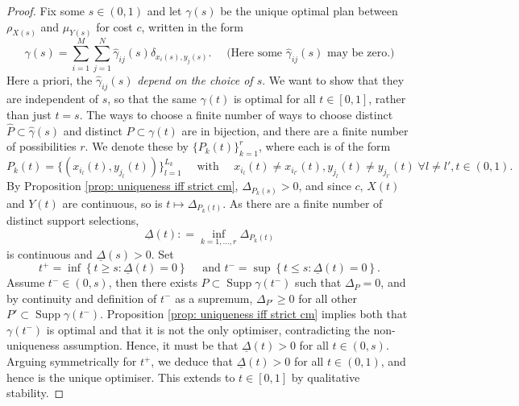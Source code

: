 \documentclass[11pt, oneside, titlepage]{book}
\theoremstyle{plain}
\theoremstyle{definition}
\DeclareMathOperator{\supp}{Supp}
\begin{document}
\begin{proof}
Fix some $s \in (0, 1)$ and let $\gamma(s)$ be the unique optimal plan between $\rho_{X(s)}$ and $\mu_{Y(s)}$ for cost $c$, written in the form
\begin{equation}
\label{eq: gamma(s) definion}
    \gamma(s) = \sum_{i = 1}^{M}\sum_{j=1}^N \hat\gamma_{ij}(s) \delta_{x_i(s), y_j(s)}. \quad \text{ (Here some $\hat\gamma_{ij}(s)$ may be zero.)}
\end{equation}
Here a priori, the $\hat\gamma_{ij}(s)$ \textit{depend on the choice of $s$}. We want to show that they are independent of $s$, so that the same $\gamma(t)$ is optimal for all  $t \in [0, 1]$, rather than just $t = s$. The ways to choose a finite number of ways to choose distinct $\hat P \subset \hat\gamma(s)$ and distinct $P \subset \gamma(t)$ are in bijection, and there are a finite number of possibilities $r$. We denote these by $\{P_k(t)\}_{k=1}^r$, where each is of the form
\begin{equation*}
    P_k(t) = \{(x_{i_l}(t), y_{j_l}(t))\}_{l=1}^{L_k} \quad \text{ with }\quad x_{i_{l}}(t) \neq x_{i_{l'}}(t), y_{j_l}(t) \neq y_{j_{l'}}(t)\; \forall l \neq l', t \in (0, 1).
\end{equation*}
By Proposition \ref{prop: uniqueness iff strict cm}, $\Delta_{P_k(s)} >0$, and since $c$, $X(t)$ and $Y(t)$ are continuous, so is $t \mapsto \Delta_{P_k(t)}$. As there are a finite number of distinct support selections,
\begin{equation*}
    \underline{\Delta}(t) : = \inf_{k = 1,..., r} \Delta_{P_k(t)}
\end{equation*}
is continuous and $\underline{\Delta}(s)>0$. Set
\begin{equation*}
    t^+ = \inf \left\{ t \geq s : \underline{\Delta}(t) = 0 \right\} \quad \text{ and } t^- = \sup\left\{t \leq s : \underline{\Delta}(t) = 0\right\}.
\end{equation*}
Assume $t^- \in (0, s)$, then there exists $P \subset \supp \gamma(t^-)$ such that $\Delta_P = 0$, and by continuity and definition of $t^-$ as a supremum, $\Delta_{P'} \geq 0$ for all other $P' \subset \supp \gamma(t^-)$. Proposition \ref{prop: uniqueness iff strict cm} implies both that $\gamma(t^-)$ is optimal and that it is not the only optimiser, contradicting the non-uniqueness assumption. Hence, it must be that $\underline{\Delta}(t) > 0$ for all $t \in (0,s)$. Arguing symmetrically for $t^+$, we deduce that $\underline{\Delta}(t) > 0$ for all $t \in (0,1)$, and hence is the unique optimiser. This extends to $t \in [0, 1]$ by qualitative stability.


\end{proof}
\end{document}
